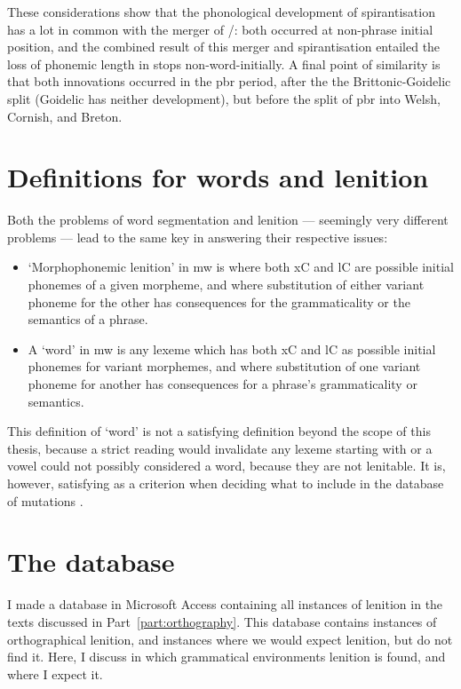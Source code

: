 These considerations show that the phonological development of spirantisation has a lot in common with the merger of \xD/\lT: both occurred at non-phrase initial position, and the combined result of this merger and spirantisation entailed the loss of phonemic length in stops non-word-initially.
A final point of similarity is that both innovations occurred in the \gls{pbr} period, after the the Brittonic-Goidelic split (Goidelic has neither development), but before the split of \gls{pbr} into Welsh, Cornish, and Breton.

\section{Definitions for words and lenition}

Both the problems of word segmentation and lenition --- seemingly very different problems --- lead to the same key in answering their respective issues: 
\begin{itemize}
    \item `Morphophonemic lenition' in \gls{mw} is where both \gls{x}\gls{C}  and \gls{l}\gls{C} are possible initial phonemes of a given morpheme, and where  substitution of either variant phoneme for the other has consequences for the grammaticality or the semantics of a phrase.
    \item A `word' in \gls{mw} is any lexeme which has both \gls{x}\gls{C} and \gls{l}\gls{C} as possible initial phonemes for variant morphemes, and where  substitution of one variant phoneme for another has consequences for a phrase's grammaticality or semantics.
\end{itemize}
This definition of `word' is not a satisfying definition beyond the scope of this thesis, because a strict reading would invalidate any lexeme starting with  or a vowel could not possibly considered a word, because they are not lenitable. It is, however, satisfying as a criterion when deciding what to include in the database of mutations .

\section{The database}
\label{sec:database}

I made a database in Microsoft Access containing all instances of lenition in the texts discussed in Part~\ref{part:orthography}. This database contains instances of orthographical lenition, and instances where we would expect lenition, but do not find it. Here, I discuss in which grammatical environments lenition is found, and where I expect it.

